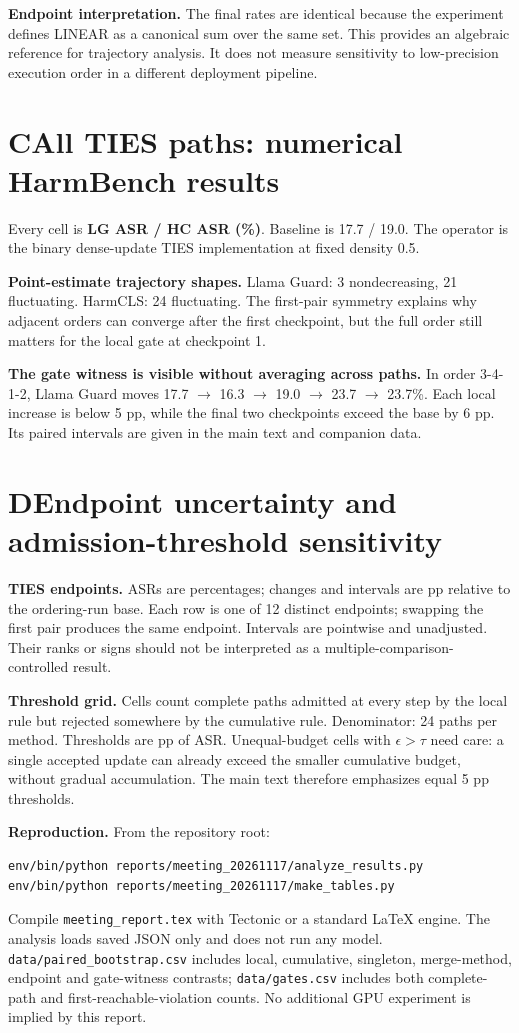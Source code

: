 \documentclass[10pt,a4paper]{article}
\newcommand{\LG}{Llama Guard}
\newcommand{\HC}{HarmCLS}
\newcommand{\heading}[2]{\section*{#1\quad #2}}
\begin{document}
\textbf{Endpoint interpretation.} The final rates are identical because the experiment defines LINEAR as a canonical sum over the same set. This provides an algebraic reference for trajectory analysis. It does not measure sensitivity to low-precision execution order in a different deployment pipeline.

\clearpage
\heading{C}{All TIES paths: numerical HarmBench results}
Every cell is \textbf{LG ASR / HC ASR (\%)}. Baseline is 17.7 / 19.0. The operator is the binary dense-update TIES implementation at fixed density 0.5.
\begin{center}\small\end{center}
\textbf{Point-estimate trajectory shapes.} \LG{}: 3 nondecreasing, 21 fluctuating. \HC{}: 24 fluctuating. The first-pair symmetry explains why adjacent orders can converge after the first checkpoint, but the full order still matters for the local gate at checkpoint 1.

\textbf{The gate witness is visible without averaging across paths.} In order 3-4-1-2, \LG{} moves 17.7 $\to$ 16.3 $\to$ 19.0 $\to$ 23.7 $\to$ 23.7\%. Each local increase is below 5 pp, while the final two checkpoints exceed the base by 6 pp. Its paired intervals are given in the main text and companion data.

\clearpage
\heading{D}{Endpoint uncertainty and admission-threshold sensitivity}
\textbf{TIES endpoints.} ASRs are percentages; changes and intervals are pp relative to the ordering-run base. Each row is one of 12 distinct endpoints; swapping the first pair produces the same endpoint. Intervals are pointwise and unadjusted. Their ranks or signs should not be interpreted as a multiple-comparison-controlled result.
\begin{center}\footnotesize\setlength{\tabcolsep}{4pt}\end{center}

\textbf{Threshold grid.} Cells count complete paths admitted at every step by the local rule but rejected somewhere by the cumulative rule. Denominator: 24 paths per method. Thresholds are pp of ASR. Unequal-budget cells with $\epsilon>\tau$ need care: a single accepted update can already exceed the smaller cumulative budget, without gradual accumulation. The main text therefore emphasizes equal 5 pp thresholds.
\begin{center}\small\end{center}

\textbf{Reproduction.} From the repository root:
\begin{verbatim}
env/bin/python reports/meeting_20261117/analyze_results.py
env/bin/python reports/meeting_20261117/make_tables.py
\end{verbatim}
Compile \texttt{meeting\_report.tex} with Tectonic or a standard LaTeX engine. The analysis loads saved JSON only and does not run any model. \texttt{data/paired\_bootstrap.csv} includes local, cumulative, singleton, merge-method, endpoint and gate-witness contrasts; \texttt{data/gates.csv} includes both complete-path and first-reachable-violation counts. No additional GPU experiment is implied by this report.
\end{document}

